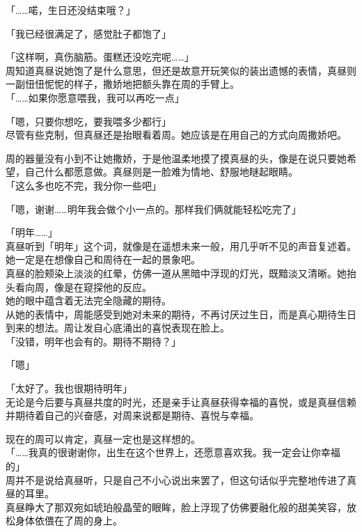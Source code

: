 「……喏，生日还没结束哦？」

「我已经很满足了，感觉肚子都饱了」

「这样啊，真伤脑筋。蛋糕还没吃完呢……」\\

周知道真昼说她饱了是什么意思，但还是故意开玩笑似的装出遗憾的表情，真昼则一副忸忸怩怩的样子，撒娇地把额头靠在周的手臂上。\\

「……如果你愿意喂我，我可以再吃一点」

「嗯，只要你想吃，要我喂多少都行」\\

尽管有些克制，但真昼还是抬眼看着周。她应该是在用自己的方式向周撒娇吧。

周的器量没有小到不让她撒娇，于是他温柔地摸了摸真昼的头，像是在说只要她希望，自己什么都愿意做。真昼则是一脸难为情地、舒服地瞇起眼睛。\\

「这么多也吃不完，我分你一些吧」

「嗯，谢谢……明年我会做个小一点的。那样我们俩就能轻松吃完了」

「明年……」\\

真昼听到「明年」这个词，就像是在遥想未来一般，用几乎听不见的声音复述着。她一定是在想像自己和周待在一起的景象吧。\\

真昼的脸颊染上淡淡的红晕，仿佛一道从黑暗中浮现的灯光，既黯淡又清晰。她抬头看向周，像是在窥探他的反应。\\

她的眼中蕴含着无法完全隐藏的期待。\\

从她的表情中，周能感受到她对未来的期待，不再讨厌过生日，而是真心期待生日到来的想法。周让发自心底涌出的喜悦表现在脸上。\\

「没错，明年也会有的。期待不期待？」

「嗯」

「太好了。我也很期待明年」\\

无论是今后要与真昼共度的时光，还是亲手让真昼获得幸福的喜悦，或是真昼信赖并期待着自己的兴奋感，对周来说都是期待、喜悦与幸福。

现在的周可以肯定，真昼一定也是这样想的。\\

「……我真的很谢谢你，出生在这个世界上，还愿意喜欢我。我一定会让你幸福的」\\

周并不是说给真昼听，只是自己不小心说出来罢了，但这句话似乎完整地传进了真昼的耳里。\\

真昼睁大了那双宛如琥珀般晶莹的眼眸，脸上浮现了仿佛要融化般的甜美笑容，放松身体依偎在了周的身上。
